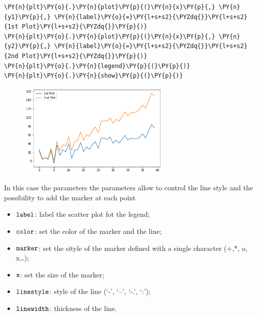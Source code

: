 \begin{tcolorbox}[breakable, size=fbox, boxrule=1pt, pad at break*=1mm,colback=cellbackground, colframe=cellborder]
\begin{Verbatim}[commandchars=\\\{\}]
\PY{n}{plt}\PY{o}{.}\PY{n}{plot}\PY{p}{(}\PY{n}{x}\PY{p}{,} \PY{n}{y1}\PY{p}{,} \PY{n}{label}\PY{o}{=}\PY{l+s+s2}{\PYZdq{}}\PY{l+s+s2}{1st Plot}\PY{l+s+s2}{\PYZdq{}}\PY{p}{)}
\PY{n}{plt}\PY{o}{.}\PY{n}{plot}\PY{p}{(}\PY{n}{x}\PY{p}{,} \PY{n}{y2}\PY{p}{,} \PY{n}{label}\PY{o}{=}\PY{l+s+s2}{\PYZdq{}}\PY{l+s+s2}{2nd Plot}\PY{l+s+s2}{\PYZdq{}}\PY{p}{)}
\PY{n}{plt}\PY{o}{.}\PY{n}{legend}\PY{p}{(}\PY{p}{)}
\PY{n}{plt}\PY{o}{.}\PY{n}{show}\PY{p}{(}\PY{p}{)}
\end{Verbatim}
\end{tcolorbox}

\begin{figure}[h]
	\centering
	\includegraphics[width=0.65\textwidth]{figures/matplotlib_13_0.png}
\end{figure}

In this case the parameters the parameters allow to control the line
style and the possibility to add the marker at each point

\begin{itemize}
	\tightlist
	\item
	\(\tt{label}\): label the scatter plot fot the legend;
	\item
	\(\tt{color}\): set the color of the marker and the line;
	\item
	\(\tt{marker}\): set the sityle of the marker defined with a single
	character (+,*, o, x\ldots{});
	\item
	\(\tt{s}\): set the size of the marker;
	\item
	\(\tt{linestyle}\): style of the line (`-', `--', `-.', `:');
	\item
	\(\tt{linewidth}\): thickness of the line.
\end{itemize}

